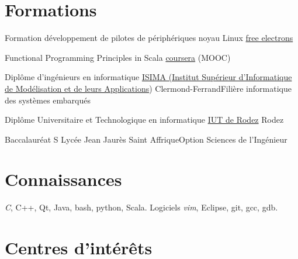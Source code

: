 \documentclass[10pt,a4paper,sans]{moderncv}
\begin{document}
\section{Formations}
	{Formation développement de pilotes de périphériques noyau Linux}
	{\href{http://free-electrons.com/}{free electrons}}
	{}{}{}
	
	{Functional Programming Principles in Scala}
	{\href{https://fr.coursera.org/course/progfun}{coursera}}
	{(MOOC)}{}{}

	{Diplôme d’ingénieurs en informatique}
	{\href{http://www.isima.fr/}{ISIMA (Institut Supérieur d’Informatique de Modélisation et de leurs Applications})}
	{Clermond-Ferrand}{Filière informatique des systèmes embarqués}{}

	{Diplôme Universitaire et Technologique en informatique}
	{\href{http://www.iut-rodez.fr/}{IUT de Rodez}}
	{Rodez}{}{}

	{Baccalauréat S}
	{Lycée Jean Jaurès}
	{Saint Affrique}{Option Sciences de l'Ingénieur}{}


\section{Connaissances}
								{\emph{C}, C++, Qt, Java, bash, python, Scala.}
						 {Logiciels}
								{\emph{vim}, Eclipse, git, gcc, gdb.}


	
						
\section{Centres d'intérêts}
\end{document}
